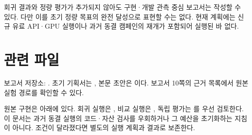 \documentclass[a4paper,11pt]{article}
\begin{document}
회귀 결과와 정량 평가가 추가되지 않아도 구현·개발 관측 중심 보고서는 작성할 수
있다. 다만 이를 초기 정량 목표의 완전 달성으로 표현할 수는 없다. 현재 계획에는
신규 유료 API·GPU 실행이나 과거 동결 캠페인의 재개가 포함되어 실행된 바 없다.

\section{관련 파일}
보고서 저장소: .
초기 기획서는 , 본문 초안은 이다.
보고서 10쪽의 근거 목록에서 원본 실험 경로를 확인할 수 있다.

원본 구현은  아래에 있다.
회귀 실행은 , 비교 실행은
, 독립 평가는
를 우선 검토한다.
이 문서는 과거 동결 실행의 코드·자산 검사를 우회하거나 그 예산을 초기화하는
지침이 아니다. 조건이 달라졌다면 별도의 실행 계획과 결과로 보존한다.
\end{document}

